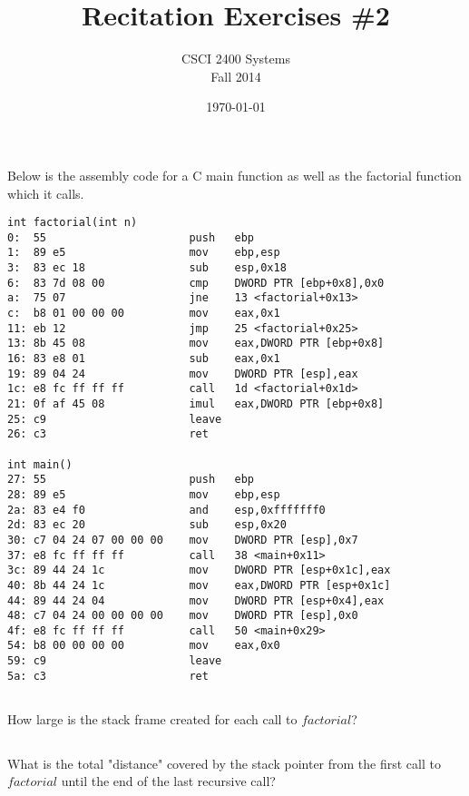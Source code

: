 \documentclass[a4paper]{article}
\title{Recitation Exercises \#2}
\author{CSCI 2400 Systems\\Fall 2014 }
\date{\today}
\begin{document}
	\maketitle
	
	\section{}
	Below is the assembly code for a C main function as well as the factorial function which it calls. 
	\begin{lstlisting}
int factorial(int n) 
0:	55                   	push   ebp
1:	89 e5                	mov    ebp,esp
3:	83 ec 18             	sub    esp,0x18
6:	83 7d 08 00          	cmp    DWORD PTR [ebp+0x8],0x0
a:	75 07                	jne    13 <factorial+0x13>
c:	b8 01 00 00 00       	mov    eax,0x1
11:	eb 12                	jmp    25 <factorial+0x25>
13:	8b 45 08             	mov    eax,DWORD PTR [ebp+0x8]
16:	83 e8 01             	sub    eax,0x1
19:	89 04 24             	mov    DWORD PTR [esp],eax
1c:	e8 fc ff ff ff       	call   1d <factorial+0x1d>
21:	0f af 45 08          	imul   eax,DWORD PTR [ebp+0x8]
25:	c9                   	leave  
26:	c3                   	ret    

int main()
27:	55                   	push   ebp
28:	89 e5                	mov    ebp,esp
2a:	83 e4 f0             	and    esp,0xfffffff0
2d:	83 ec 20             	sub    esp,0x20
30:	c7 04 24 07 00 00 00 	mov    DWORD PTR [esp],0x7
37:	e8 fc ff ff ff       	call   38 <main+0x11>
3c:	89 44 24 1c          	mov    DWORD PTR [esp+0x1c],eax
40:	8b 44 24 1c          	mov    eax,DWORD PTR [esp+0x1c]
44:	89 44 24 04          	mov    DWORD PTR [esp+0x4],eax
48:	c7 04 24 00 00 00 00 	mov    DWORD PTR [esp],0x0
4f:	e8 fc ff ff ff       	call   50 <main+0x29>
54:	b8 00 00 00 00       	mov    eax,0x0
59:	c9                   	leave  
5a:	c3                   	ret    
	\end{lstlisting}
	
	\subsection{}
	How large is the stack frame created for each call to $factorial$? 
	
	\subsection{}
	What is the total "distance" covered by the stack pointer from the first call to $factorial$ until the end
	of the last recursive call?
	
\end{document}
